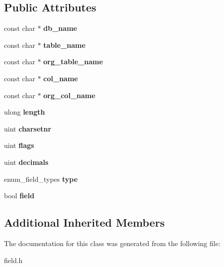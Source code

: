\subsection*{Public Attributes}
\begin{DoxyCompactItemize}
\item 
\mbox{\label{classSend__field_ad82f725d4a7852ddd5bac2a62ee3c5ef}} 
const char $\ast$ {\bfseries db\+\_\+name}
\item 
\mbox{\label{classSend__field_a9a1b612ec8e50833e97f0e1ab2556147}} 
const char $\ast$ {\bfseries table\+\_\+name}
\item 
\mbox{\label{classSend__field_ad9b972cda9a177617c4f9abd219bee21}} 
const char $\ast$ {\bfseries org\+\_\+table\+\_\+name}
\item 
\mbox{\label{classSend__field_a1846d4d2fa103738f638ec228f2dd772}} 
const char $\ast$ {\bfseries col\+\_\+name}
\item 
\mbox{\label{classSend__field_ab06fc583f55237aeed112b317cc88bcc}} 
const char $\ast$ {\bfseries org\+\_\+col\+\_\+name}
\item 
\mbox{\label{classSend__field_a2db6fe8a405e43308b315d975819e3bb}} 
ulong {\bfseries length}
\item 
\mbox{\label{classSend__field_a399a85592b3124c6804de43939a745df}} 
uint {\bfseries charsetnr}
\item 
\mbox{\label{classSend__field_ad1e27363e6e3941cae143afb584d900c}} 
uint {\bfseries flags}
\item 
\mbox{\label{classSend__field_a8805bdffa32c9d62d84463468e8ab85e}} 
uint {\bfseries decimals}
\item 
\mbox{\label{classSend__field_a5f5d52423f36724549c52012f58d0fd9}} 
enum\+\_\+field\+\_\+types {\bfseries type}
\item 
\mbox{\label{classSend__field_a5630dfdd7f40fa31ab28346c1ec6bf37}} 
bool {\bfseries field}
\end{DoxyCompactItemize}
\subsection*{Additional Inherited Members}


The documentation for this class was generated from the following file\+:\begin{DoxyCompactItemize}
\item 
field.\+h\end{DoxyCompactItemize}
